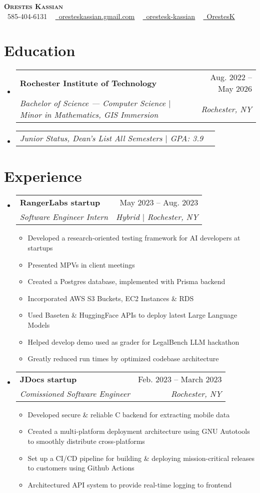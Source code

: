 \documentclass[letterpaper,11pt]{article}
\makeatletter
\newcommand{\resumeItem}[1]{
  \item\small{
    {#1 \vspace{-2pt}}
  }
}
\newcommand{\resumeSubheading}[4]{
  \vspace{-2pt}\item
    \begin{tabular*}{0.97\textwidth}[t]{l@{\extracolsep{\fill}}r}
      \textbf{#1} & #2 \\
      \textit{\small#3} & \textit{\small #4} \\
    \end{tabular*}\vspace{-7pt}
}
\newcommand{\resumeSubSubheading}[2]{
    \item
    \begin{tabular*}{0.97\textwidth}{l@{\extracolsep{\fill}}r}
      \textit{\small#1} & \textit{\small #2} \\
    \end{tabular*}\vspace{-7pt}
}
\newcommand{\resumeSubHeadingListStart}{\begin{itemize}[leftmargin=0.15in, label={}]}
\newcommand{\resumeSubHeadingListEnd}{\end{itemize}}
\newcommand{\resumeItemListStart}{\begin{itemize}}
\newcommand{\resumeItemListEnd}{\end{itemize}\vspace{-5pt}}
\makeatother
\begin{document}
\begin{center}
    \textbf{\Huge \scshape Orestes Kassian} \\ \vspace{4pt}
    \small 
    \faPhone\ 585-404-6131 ~
    \href{oresteskassian@gmail.com}{\faEnvelope\ \uline{oresteskassian.gmail.com}} ~
    \href{https://linkedin.com/in/orestes-kassian}{\faLinkedin\ \uline{orestesk-kassian}} ~
    \href{https://github.com/OrestesK}{\faGithub\ \uline{OrestesK}}
\end{center}
\vspace{-22pt}

\section{Education}
\resumeSubHeadingListStart
    \resumeSubheading
        {Rochester Institute of Technology}{ Aug. 2022 -- May 2026}
        {Bachelor of Science --- Computer Science $|$ Minor in Mathematics, GIS Immersion}{ Rochester, NY}
    \vspace{-8pt}
    \resumeSubSubheading
        {Junior Status, Dean’s List All Semesters $|$ GPA: 3.9}{}
\resumeSubHeadingListEnd

\section{Experience}
\resumeSubHeadingListStart
    \resumeSubheading
        {RangerLabs startup}{ May 2023 -- Aug. 2023}
        {Software Engineer Intern}{ Hybrid $|$ Rochester, NY}
    \resumeItemListStart
        \resumeItem{Developed a research-oriented testing framework for AI developers at startups}
        \resumeItem{Presented MPVs in client meetings}
        \resumeItem{Created a Postgres database, implemented with Prisma backend}
        \resumeItem{Incorporated AWS S3 Buckets, EC2 Instances \& RDS}
        \resumeItem{Used Baseten \& HuggingFace APIs to deploy latest Large Language Models}
        \resumeItem{Helped develop demo used as grader for LegalBench LLM hackathon}
        \resumeItem{Greatly reduced run times by optimized codebase architecture}
    \resumeItemListEnd

    \resumeSubheading
        {JDocs startup}{ Feb. 2023 -- March 2023}
        {Comissioned Software Engineer}{ Rochester, NY}
    \resumeItemListStart
        \resumeItem{Developed secure \& reliable C backend for extracting mobile data}
        \resumeItem{Created a multi-platform deployment architecture using GNU Autotools to smoothly distribute cross-platforms}
        \resumeItem{Set up a CI/CD pipeline for building \& deploying mission-critical releases to customers using Github Actions}
        \resumeItem{Architectured API system to provide real-time logging to frontend}
    \resumeItemListEnd
\resumeSubHeadingListEnd
\end{document}
